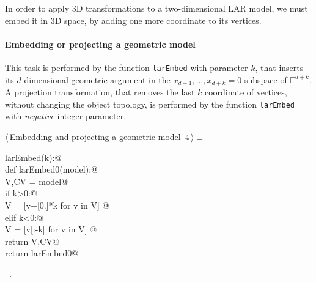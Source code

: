 \documentclass[11pt,oneside]{article}	%
\def\E{\mathbb{E}}
\begin{document}
In order to apply 3D transformations to a two-dimensional LAR model, we must embed it in 3D space, by adding one more coordinate to its vertices. 

\paragraph{Embedding or projecting a geometric model}

This task is performed by the function \texttt{larEmbed} with parameter $k$, that inserts its $d$-dimensional geometric argument in the $x_{d+1}, \ldots, x_{d+k}=0$ subspace of $\E^{d+k}$.
A projection transformation, that removes the last $k$ coordinate of vertices, without changing the object topology, is performed by the function \texttt{larEmbed} with \emph{negative} integer parameter.


\begin{flushleft} \small \label{scrap5}
\protect{}$\langle\,$Embedding and projecting a geometric model\nobreak\ {\footnotesize 4}$\,\rangle\equiv$
\vspace{-1ex}
\begin{list}{}{} \item
\mbox{}\verb@def larEmbed(k):@\\
\mbox{}\verb@   def larEmbed0(model):@\\
\mbox{}\verb@      V,CV = model@\\
\mbox{}\verb@      if k>0:@\\
\mbox{}\verb@         V = [v+[0.]*k for v in V] @\\
\mbox{}\verb@      elif k<0:@\\
\mbox{}\verb@         V = [v[:-k] for v in V] @\\
\mbox{}\verb@      return V,CV@\\
\mbox{}\verb@   return larEmbed0@\\
\mbox{}\verb@@{\NWsep}
\end{list}
\vspace{-1ex}
\footnotesize\addtolength{\baselineskip}{-1ex}
\begin{list}{}{\setlength{\itemsep}{-\parsep}\setlength{\itemindent}{-\leftmargin}}
\item \NWtxtMacroRefIn\ .
\end{list}
\end{flushleft}
\end{document}
